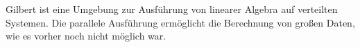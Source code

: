 \clearemptydoublepage
{}
{}	


\vspace*{2cm}
\begin{center}
\end{center}
\vspace{1cm}

Gilbert ist eine Umgebung zur Ausführung von linearer Algebra auf verteilten Systemen.
Die parallele Ausführung ermöglicht die Berechnung von großen Daten, wie es vorher noch nicht möglich war.